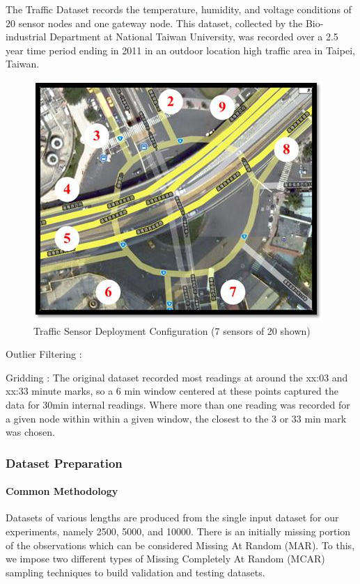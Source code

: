 The Traffic Dataset records the temperature, humidity, and voltage conditions of 20 sensor nodes and one gateway node.
This dataset, collected by the Bio-industrial Department at National Taiwan University, was recorded over a 2.5 year time period ending in 2011 in an outdoor location high traffic area in Taipei, Taiwan.

\begin{figure}[H]
\centering
\includegraphics[scale=0.5]{traffic_wsn.png}
\caption{Traffic Sensor Deployment Configuration (7 sensors of 20 shown)}
\end{figure}

Outlier Filtering : 

Gridding : The original dataset recorded most readings at around the xx:03 and xx:33 minute marks, so a 6 min window centered at
these points captured the data for 30min internal readings. Where more than one reading was recorded for a given node
within within a given window, the closest to the 3 or 33 min mark was chosen.

\subsubsection{Dataset Preparation}

\paragraph*{Common Methodology}

Datasets of various lengths are produced from the single input dataset for our experiments, namely 2500, 5000, and 10000.
There is an initially missing portion of the observations which can be considered Missing At Random (MAR).
To this, we impose two different types of Missing Completely At Random (MCAR) sampling techniques to build validation and testing datasets.

